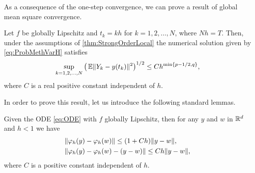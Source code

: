 \documentclass[10pt]{article}
\begin{document}
As a consequence of the one-step convergence, we can prove a result of global mean square convergence.
\begin{theorem}\label{thm:StrongOrder} Let $f$ be globally Lipschitz and $t_k = kh$ for $k = 1, 2, \ldots, N$, where $Nh = T$. Then, under the assumptions of \cref{thm:StrongOrderLocal} the numerical solution given by \eqref{eq:ProbMethVarH} satisfies 
	\begin{equation}\label{eq:StrongGlobalClaim}
		\sup_{k=1,2, \ldots, N} \big(\operatorname{\mathbb{E}}\lVert Y_k - y(t_k)\rVert^2\big)^{1/2} \leq C h^{\min\{p-1/2, q\}},
	\end{equation}
	where $C$ is a real positive constant independent of $h$.
\end{theorem}
In order to prove this result, let us introduce the following standard lemmas.
\begin{lemma}\label{lem:ODERepresentation} Given the ODE \eqref{eq:ODE} with $f$ globally Lipschitz, then for any $y$ and $w$ in $\mathbb{R}^d$ and $h < 1$ we have
	\begin{align}
		&\lVert\varphi_h(y) - \varphi_h(w)\rVert \leq (1 + Ch) \lVert y - w\rVert,\\
		&\lVert\varphi_h(y) - \varphi_h(w) - (y - w)\rVert \leq Ch\lVert y - w\rVert,
	\end{align}
	where $C$ is a positive constant independent of $h$.
\end{lemma}
\end{document}
